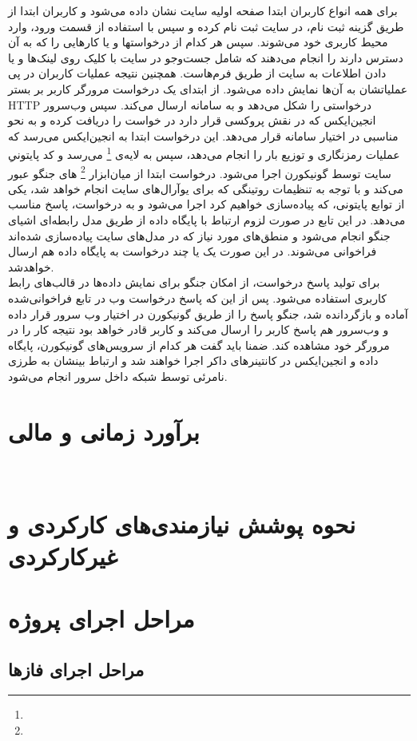 \documentclass{article}
\begin{document}
برای همه انواع کاربران ابتدا صفحه اولیه سایت نشان داده‌ می‌شود و کاربران ابتدا از طریق گزینه ثبت نام، در سایت ثبت نام کرده و سپس با استفاده از قسمت ورود، وارد محیط کاربری خود می‌شوند. سپس  هر کدام از درخواستها و یا کارهایی را که به آن دسترس دارند را انجام می‌دهند که شامل جست‌و‌جو در سایت با کلیک روی لینک‌ها و یا دادن اطلاعات به سایت از طریق فرم‌هاست. همچنین نتیجه عملیات کاربران در پی عملیاتشان به آن‌ها نمایش داده‌ می‌شود. از ابتدای یک درخواست مرورگر کاربر بر بستر HTTP درخواستی را شکل می‌دهد و به سامانه ارسال می‌کند. سپس وب‌سرور انجین‌ایکس که در نقش پروکسی قرار دارد در خواست را دریافت کرده و به نحو مناسبی در اختیار سامانه  قرار می‌دهد. این درخواست ابتدا به انجین‌ایکس می‌رسد که عملیات رمزنگاری و توزیع بار را انجام می‌دهد، سپس به لایه‌ی \footnote{} می‌رسد و کد پایتونیِ سایت توسط گونیکورن اجرا می‌شود. درخواست ابتدا از میان‌ابزار \footnote{} های جنگو عبور می‌کند و با توجه به تنظیمات روتینگی که برای یو‌آرال‌های سایت انجام خواهد شد، یکی از توابع پایتونی‌، که پیاده‌سازی خواهیم کرد اجرا می‌شود و به درخواست، پاسخ مناسب می‌دهد. در این تابع در صورت لزوم ارتباط با پایگاه داده از طریق مدل‌ رابطه‌ای اشیای جنگو انجام می‌شود و منطق‌های مورد نیاز که در مدل‌های سایت پیاده‌سازی شده‌اند فراخوانی می‌شوند. در این صورت یک یا چند درخواست به پایگاه داده ‌هم ارسال خواهدشد. \\
برای تولید پاسخ درخواست، از امکان جنگو برای نمایش داده‌ها در قالب‌های رابط کاربری استفاده می‌شود. پس از این که پاسخ درخواست وب در تابع فراخوانی‌شده آماده و بازگردانده شد، جنگو پاسخ را از طریق گونیکورن در اختیار وب سرور قرار داده و وب‌سرور هم پاسخ کاربر را ارسال می‌کند و کاربر قادر خواهد بود نتیجه کار را در مرورگر خود مشاهده کند. ضمنا باید گفت هر کدام از سرویس‌های گونیکورن، پایگاه داده و انجین‌ایکس در کانتینرهای داکر اجرا‌ خواهند شد و ارتباط بینشان به طرزی نامرئی توسط شبکه داخل سرور انجام می‌شود.

\section{برآورد زمانی و مالی}
‌
\section{نحوه پوشش نیازمندی‌های کارکردی و غیرکارکردی}

\section{مراحل اجرای پروژه}
\subsection{مراحل اجرای فازها}
\end{document}
